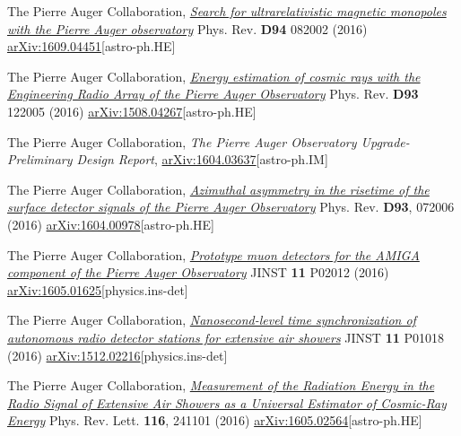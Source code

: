 \begin{etaremune}
\item {}The Pierre Auger Collaboration, \href{https://doi.org/10.1103/PhysRevD.94.082002}{\emph{Search for ultrarelativistic magnetic monopoles with the Pierre Auger observatory}} Phys. Rev. {\bf D94} 082002 (2016) \href{http://arxiv.org/abs/1609.04451}{arXiv:1609.04451}[astro-ph.HE]

\item {}The Pierre Auger Collaboration, \href{https://doi.org/10.1103/PhysRevD.93.122005}{\emph{Energy estimation of cosmic rays with the Engineering Radio Array of the Pierre Auger Observatory}} Phys. Rev. {\bf D93} 122005 (2016) \href{http://arxiv.org/abs/1508.04267}{arXiv:1508.04267}[astro-ph.HE]

\item {} The Pierre Auger Collaboration, {\emph{The Pierre Auger Observatory Upgrade-Preliminary Design Report}}, \href{http://arxiv.org/abs/1604.03637}{arXiv:1604.03637}[astro-ph.IM]

\item {}The Pierre Auger Collaboration, \href{http://journals.aps.org/prd/abstract/10.1103/PhysRevD.93.072006}{\emph{Azimuthal asymmetry in the risetime of the surface detector signals of the Pierre Auger Observatory}} Phys. Rev. {\bf D93}, 072006 (2016) \href{http://arxiv.org/abs/1604.00978}{arXiv:1604.00978}[astro-ph.HE]

\item {}The Pierre Auger Collaboration, \href{http://iopscience.iop.org/article/10.1088/1748-0221/11/02/P02012}{\emph{Prototype muon detectors for the AMIGA component of the Pierre Auger Observatory}} JINST {\bf 11} P02012 (2016) \href{http://arxiv.org/abs/1605.01625}{arXiv:1605.01625}[physics.ins-det]

\item {}The Pierre Auger Collaboration, \href{http://iopscience.iop.org/article/10.1088/1748-0221/11/01/P01018}{\emph{Nanosecond-level time synchronization of autonomous radio detector stations for extensive air showers}} JINST {\bf 11} P01018 (2016) \href{http://arxiv.org/abs/1512.02216}{arXiv:1512.02216}[physics.ins-det]

\item {}The Pierre Auger Collaboration, \href{http://journals.aps.org/prl/abstract/10.1103/PhysRevLett.116.241101}{\emph{Measurement of the Radiation Energy in the Radio Signal of Extensive Air Showers as a Universal Estimator of Cosmic-Ray Energy}} Phys. Rev. Lett. {\bf 116}, 241101 (2016) \href{http://arxiv.org/abs/1605.02564}{arXiv:1605.02564}[astro-ph.HE]


\end{etaremune}
